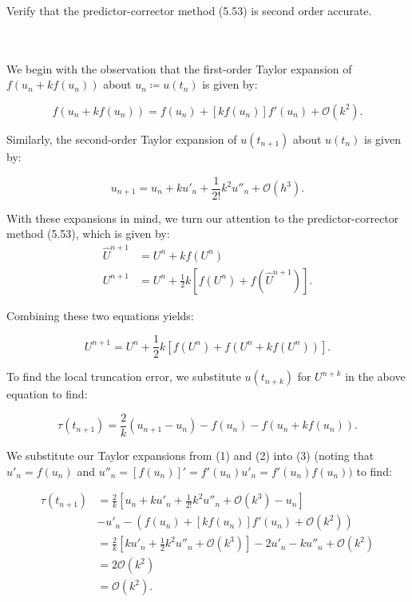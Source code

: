 Verify that the predictor-corrector method (5.53) is second order accurate.

\begin{solution}\ \\\\
    We begin with the observation that the first-order Taylor expansion of \linebreak
    $f(u_n + k f(u_n))$ about $u_n \coloneqq u(t_n)$ is given by:

    \begin{equation}
        f(u_n + k f(u_n)) = f(u_n) + \left[k f(u_n)\right] f'(u_n) + \mathcal{O}(k^2).
    \end{equation}

    Similarly, the second-order Taylor expansion of $u(t_{n+1})$ about $u(t_n)$ is given by:

    \begin{equation}
        u_{n+1} = u_n + k u'_n + \frac{1}{2!} k^2 u''_n + \mathcal{O}(h^3).
    \end{equation}

    With these expansions in mind, we turn our attention to the predictor-corrector method (5.53), which is given by:
    \begin{align*}
        \hat{U}^{n+1} &= U^n + kf(U^{n}) \\
        U^{n+1}      &= U^n + \frac{1}{2} k \left[f(U^n) + f(\hat{U}^{n+1})\right].
    \end{align*}

    Combining these two equations yields:

    $$
    U^{n+1} = U^n + \frac{1}{2} k \left[f(U^n) + f(U^n + kf(U^{n}))\right].
    $$

    To find the local truncation error, we substitute $u(t_{n + k})$ for $U^{n+k}$ in the above equation to find:

    \begin{equation}
        \tau(t_{n+1}) = \frac{2}{k} (u_{n+1} - u_n) - f(u_n) - f(u_n + kf(u_n)).
    \end{equation}

    We substitute our Taylor expansions from (1) and (2) into (3) (noting that $u'_n = f(u_n)$ and 
    $u''_n = [f(u_n)]' = f'(u_n) u'_n = f'(u_n) f(u_n))$ to find:

    \begin{align*}
    \tau(t_{n+1}) &= \frac{2}{k} \left[ u_n + k u'_n + \frac{1}{2!} k^2 u''_n + \mathcal{O}(k^3) - u_n \right] \\
                  & - u'_n - \left( f(u_n) + \left[k f(u_n)\right] f'(u_n) + \mathcal{O}(k^2) \right)  \\
                  &= \frac{2}{k} \left[ k u'_n + \frac{1}{2} k^2 u''_n + \mathcal{O}(k^3) \right] - 2 u'_n - k u''_n + \mathcal{O}(k^2) \\
                  &= 2 \mathcal{O}(k^2) \\
                  &= \mathcal{O}(k^2).
    \end{align*}
    \ \\
\end{solution}